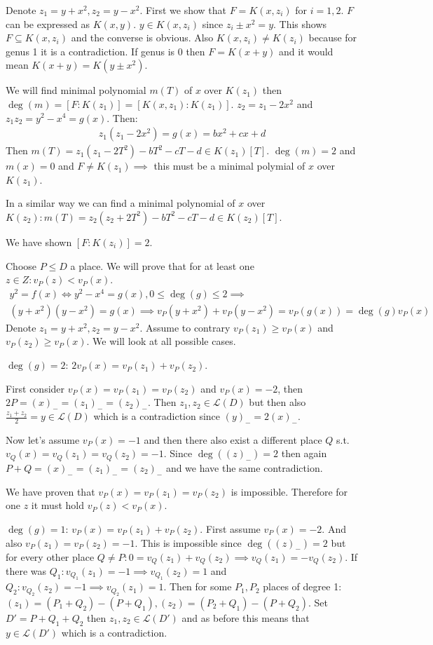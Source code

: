 \documentclass[12pt, a4paper]{article}
\begin{document}
Denote $z_1=y+x^2, z_2=y-x^2$. First we show that $F=K(x,z_i)$ for $i=1,2$. $F$ can be expressed as $K(x,y)$. $y\in K(x,z_i)$ since $z_i \pm x^2 = y$. This shows $F \subseteq K(x,z_i)$ and the converse is obvious. Also $K(x,z_i) \neq K(z_i)$ because for genus 1 it is a contradiction. If genus is 0 then $F=K(x+y)$ and it would mean $K(x+y)=K(y \pm x^2)$. 

We will find minimal polynomial $m(T)$ of $x$ over $K(z_1)$ then $\deg(m) = [F:K(z_1)]=[K(x,z_1):K(z_1)]$. $z_2 = z_1 - 2x^2$ and $z_1z_2=y^2-x^4=g(x)$. Then:
\begin{gather*}
z_1(z_1-2x^2) = g(x) = bx^2+cx+d
\end{gather*}
Then $m(T)=z_1(z_1-2T^2)-bT^2-cT-d \in K(z_1)[T]$. $\deg(m)=2$ and $m(x)=0$ and $F\neq K(z_1) \implies$ this must be a minimal polymial of $x$ over $K(z_1)$.

In a similar way we can find a minimal polynomial of $x$ over $K(z_2): m(T) = z_2(z_2+2T^2)-bT^2-cT-d \in K(z_2)[T]$.

We have shown $[F:K(z_i)]=2$.


Choose $P \leq D$ a place. We will prove that for at least one $z \in Z: v_P(z) < v_P(x)$.
\begin{gather*}
y^2 = f(x) \iff y^2 - x^4 = g(x), 0 \leq \deg(g) \leq 2 \implies\\
(y+x^2)(y-x^2)=g(x) \implies v_P(y+x^2)+v_P(y-x^2) = v_P(g(x)) = \deg(g)v_P(x)
\end{gather*}
Denote $z_1 = y+x^2, z_2=y-x^2$. Assume to contrary $v_P(z_1) \geq v_P(x)$ and $v_P(z_2) \geq v_P(x)$. We will look at all possible cases.

$\deg(g)=2$: $2v_P(x)=v_P(z_1)+v_P(z_2)$. 

First consider $v_P(x)=v_P(z_1)=v_P(z_2)$ and $v_P(x)=-2$, then $2P = (x)_{-}= (z_1)_{-} = (z_2)_{-}$. Then $z_1, z_2 \in \mathcal{L}(D)$ but then also $\frac{z_1+z_2}{2} = y \in \mathcal{L}(D)$ which is a contradiction since $(y)_{-}=2(x)_{-}$.

Now let's assume $v_P(x)=-1$ and then there also exist a different place $Q$ s.t. $v_Q(x)=v_Q(z_1)=v_Q(z_2)=-1$. Since $\deg((z)_{-})=2$ then again $P+Q = (x)_{-}= (z_1)_{-} = (z_2)_{-}$ and we have the same contradiction.

We have proven that $v_P(x)=v_P(z_1)=v_P(z_2)$ is impossible. Therefore for one $z$ it must hold $v_P(z)<v_P(x)$.

$\deg(g)=1$: $v_P(x)=v_P(z_1)+v_P(z_2)$. First assume $v_P(x)=-2$. And also $v_P(z_1)=v_P(z_2)=-1$. This is impossible since $\deg((z)_{-})=2$ but for every other place $Q \neq P: 0 = v_Q(z_1)+v_Q(z_2) \implies v_Q(z_1)=-v_Q(z_2)$. If there was $Q_1: v_{Q_1}(z_1)=-1 \implies v_{Q_1}(z_2)=1$ and $Q_2: v_{Q_2}(z_2)=-1 \implies v_{Q_2}(z_1)=1$. Then for some $P_1,P_2$ places of degree 1: $(z_1)=(P_1+Q_2)-(P+Q_1), (z_2)=(P_2+Q_1)-(P+Q_2)$. Set $D'=P+Q_1+Q_2$ then $z_1,z_2 \in \mathcal{L}(D')$ and as before this means that $y \in \mathcal{L}(D')$ which is a contradiction.
\end{document}
